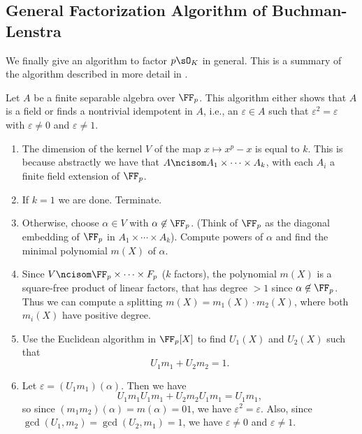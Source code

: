 \subsection{General Factorization Algorithm of Buchman-Lenstra}

We finally give an algorithm to factor $p\sO_K$ in general. This is a
summary of the algorithm described in more detail in
\cite[\S6.2]{cohen:course_ant}.

\begin{algorithm}\label{alg:factorsep}
  Let $A$ be a finite separable algebra over $\FF_p$.  This
  algorithm either shows that $A$ is a field or finds
  a nontrivial idempotent in $A$, i.e., an $\varepsilon\in A$
  such that $\varepsilon^2 = \varepsilon$ with $\varepsilon\neq 0$ and $\varepsilon\neq 1$.
  \begin{enumerate}
    \item The dimension of the kernel $V$ of the map $x\mapsto x^p - x$ is
    equal to $k$.  This is because abstractly we have that $A\ncisom
    A_1\times \cdots \times A_k$, with each $A_i$ a finite field
    extension of $\FF_p$.
    \item If $k=1$ we are done.  Terminate.
    \item Otherwise, choose $\alpha \in V$ with $\alpha \not\in \FF_p$.
    (Think of $\FF_p$ as the diagonal embedding of $\FF_p$ in
    $A_1\times \cdots \times A_k$).
    Compute powers of $\alpha$ and find the minimal polynomial $m(X)$
    of $\alpha$.
    \item Since $V\ncisom \FF_p \times \cdots \times F_p$ ($k$ factors),
    the polynomial $m(X)$ is a square-free product of linear factors, that
    has degree $>1$ since $\alpha\not\in\FF_p$.  Thus we can compute
    a splitting $m(X) = m_1(X) \cdot m_2(X)$, where both $m_i(X)$ have
    positive degree.
    \item Use the Euclidean algorithm in $\FF_p[X]$ to find
    $U_1(X)$ and $U_2(X)$ such that
    $$
      U_1 m_1 + U_2 m_2 = 1.
    $$
    \item Let $\varepsilon = (U_1 m_1)(\alpha)$.  Then we have
    $$
      U_1 m_1 U_1 m_1 + U_2 m_2 U_1 m_1 = U_1 m_1,
    $$
    so since $(m_1 m_2)(\alpha) = m(\alpha)=01$, we have $\varepsilon^2 = \varepsilon$.
    Also, since $\gcd(U_1, m_2) = \gcd(U_2, m_1) = 1$,
    we have $\varepsilon\neq 0$ and $\varepsilon \neq 1$.
  \end{enumerate}
\end{algorithm}

